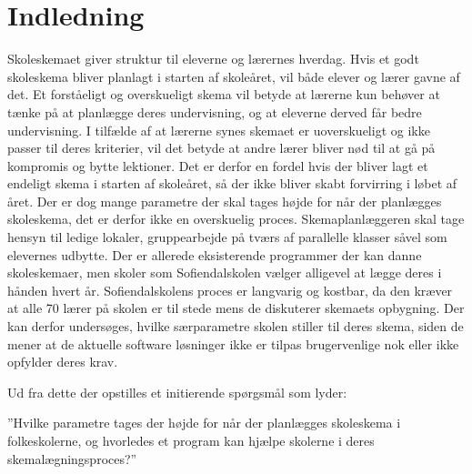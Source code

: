 \section{Indledning}
Skoleskemaet giver struktur til eleverne og lærernes hverdag. Hvis et godt skoleskema bliver planlagt i starten af skoleåret, vil både elever og lærer gavne af det. Et forståeligt og overskueligt skema vil betyde at lærerne kun behøver at tænke på at planlægge deres undervisning, og at eleverne derved får bedre undervisning. I tilfælde af at lærerne synes skemaet er uoverskueligt og ikke passer til deres kriterier, vil det betyde at andre lærer bliver nød til at gå på kompromis og bytte lektioner. Det er derfor en fordel hvis der bliver lagt et endeligt skema i starten af skoleåret, så der ikke bliver skabt forvirring i løbet af året. 
Der er dog mange parametre der skal tages højde for når der planlægges skoleskema, det er derfor ikke en overskuelig proces. Skemaplanlæggeren skal tage hensyn til ledige lokaler, gruppearbejde på tværs af parallelle klasser såvel som elevernes udbytte. Der er allerede eksisterende programmer der kan danne skoleskemaer, men skoler som Sofiendalskolen vælger alligevel at lægge deres i hånden hvert år. Sofiendalskolens proces er langvarig og kostbar, da den kræver at alle 70 lærer på skolen er til stede mens de diskuterer skemaets opbygning. Der kan derfor undersøges, hvilke særparametre skolen stiller til deres skema, siden de mener at de aktuelle software løsninger ikke er tilpas brugervenlige nok eller ikke opfylder deres krav. 

Ud fra dette der opstilles et initierende spørgsmål som lyder:

”Hvilke parametre tages der højde for når der planlægges skoleskema i folkeskolerne, og hvorledes et program kan hjælpe skolerne i deres skemalægningsproces?”
